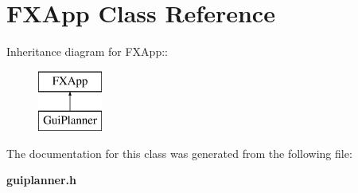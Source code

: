 \section{FXApp  Class Reference}
\label{classFXApp}
Inheritance diagram for FXApp::\begin{figure}[H]
\begin{center}
\leavevmode
\includegraphics[height=2cm]{classFXApp}
\end{center}
\end{figure}


The documentation for this class was generated from the following file:\begin{CompactItemize}
\item 
{\bf guiplanner.h}\end{CompactItemize}

